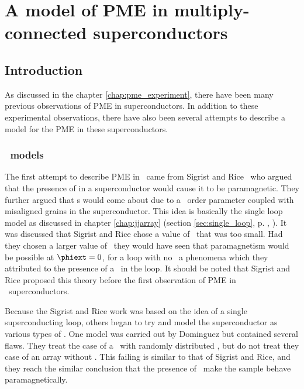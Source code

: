\chapter{A model of PME in multiply-connected superconductors}
\label{chap:pme_theory}

\section{Introduction}

As discussed in the chapter \ref{chap:pme_experiment}, there have 
been many previous observations of PME in superconductors. 
In addition to these experimental observations, there 
have also been several attempts to describe a model for 
the PME in these superconductors. 

\subsection{\pijunction\ models}

The first attempt to describe PME in \hightc\ came from
Sigrist and Rice \cite{sigrist_jpsj_61_4283_1992,%
sigrist_rmp_503_67_1995}\ who argued that the presence 
of \pijunctions in a superconductor would cause it to be
paramagnetic. They further argued that \pijunction s would
come about due to a \dwave\ order parameter coupled with
misaligned grains in the superconductor. This idea is basically
the single loop model as discussed in chapter \ref{chap:jjarray}
(section \ref{sec:single_loop}, p. \pageref{sec:single_loop}, 
).
It was discussed that Sigrist and Rice chose a value of 
\betal\ that was too small. Had they chosen a larger value
of \betal\ they would have seen that paramagnetism would be 
possible at $\phiext=0$, for a loop with no \pijunctions\, 
a phenomena which they attributed
to the presence of a \pijunction\ in the loop. It should be noted
that Sigrist and Rice proposed this theory before the first
observation of PME in \lowtc\ superconductors\cite{thompson_prl_75_529_1995}.

Because the Sigrist and Rice work was based on the idea of a 
single superconducting loop, others began to try and model the
superconductor as various types of \jjas. One model
was carried out by Dominguez \etal\cite{dominguez_prl_72_2773_1994}
but contained several flaws. They treat the case of a \jja\ with 
randomly distributed \pijunctions, but do not treat they case of an
array without \pijunctions. This failing is similar to that of 
Sigrist and Rice, and they reach the similar conclusion that 
the presence of \pijunctions\ make the sample behave 
paramagnetically. 

